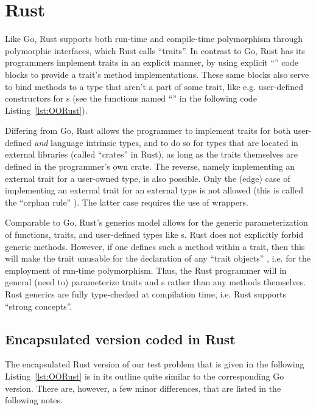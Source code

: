 \documentclass[11pt,oneside]{report}
\newcommand{\code}[1]{{\selectfont\ttfamily{#1}}}
\begin{document}
\section{Rust}

Like Go, Rust supports both run-time and compile-time polymorphism
through polymorphic interfaces, which Rust calls ``traits''. In
contrast to Go, Rust has its programmers implement traits in an
explicit manner, by using explicit ``\code{impl}'' code blocks to
provide a trait's method implementations. These same \code{impl}
blocks also serve to bind methods to a type that aren't a part of some
trait, like e.g. user-defined constructors for \code{struct}s (see the
functions named ``\code{new}'' in the following code
Listing~\ref{lst:OORust}).

Differing from Go, Rust allows the programmer to implement traits for
both user-defined \emph{and} language intrinsic types, and to do so
for types that are located in external libraries (called ``crates'' in
Rust), as long as the traits themselves are defined in the
programmer's own crate. The reverse, namely implementing an external
trait for a user-owned type, is also possible. Only the (edge) case of
implementing an external trait for an external type is not allowed
(this is called the ``orphan rule'' \cite{Klabnik_Nichols}). The
latter case requires the use of wrappers.

Comparable to Go, Rust's generics model allows for the generic
parameterization of functions, traits, and user-defined types like
\code{struct}s. Rust does not explicitly forbid generic
methods. However, if one defines such a method within a trait, then
this will make the trait unusable for the declaration of any ``trait
objects'' \cite{Lyon}, i.e. for the employment of run-time
polymorphism. Thus, the Rust programmer will in general (need to)
parameterize traits and \code{struct}s rather than any methods
themselves. Rust generics are fully type-checked at compilation time,
i.e. Rust supports ``strong concepts''.

\subsection{Encapsulated version coded in Rust}

The encapsulated Rust version of our test problem that is given in the
following Listing~\ref{lst:OORust} is in its outline quite similar to
the corresponding Go version. There are, however, a few minor
differences, that are listed in the following notes.
\end{document}
